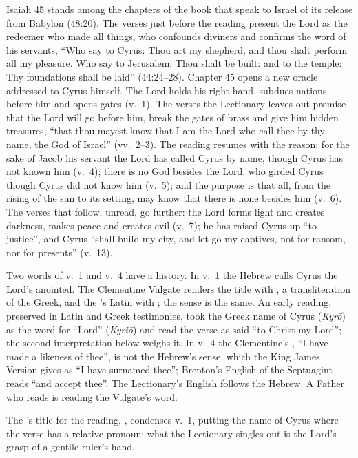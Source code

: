 Isaiah 45 stands among the chapters of the book that speak to Israel of its
release from Babylon (48:20). The verses just before the reading present the Lord as the
redeemer who made all things, who confounds diviners and confirms the word of
his servants, ``Who say to Cyrus: Thou art my shepherd, and thou shalt perform
all my pleasure. Who say to Jerusalem: Thou shalt be built: and to the temple:
Thy foundations shall be laid'' (44:24--28). Chapter 45 opens a new oracle
addressed to Cyrus himself. The Lord holds his right hand, subdues nations
before him and opens gates (v.~1). The verses the Lectionary leaves out promise
that the Lord will go before him, break the gates of brass and give him hidden
treasures, ``that thou mayest know that I am the Lord who call thee by thy
name, the God of Israel'' (vv.~2--3). The reading resumes with the reason: for
the sake of Jacob his servant the Lord has called Cyrus by name, though Cyrus
has not known him (v.~4); there is no God besides the Lord, who girded Cyrus
though Cyrus did not know him (v.~5); and the purpose is that all, from the
rising of the sun to its setting, may know that there is none besides him
(v.~6). The verses that follow, unread, go further: the Lord forms light and
creates darkness, makes peace and creates evil (v.~7); he has raised Cyrus up
``to justice'', and Cyrus ``shall build my city, and let go my captives, not
for ransom, nor for presents'' (v.~13).

Two words of v.~1 and v.~4 have a history. In v.~1 the Hebrew calls Cyrus the
Lord's anointed. The Clementine Vulgate renders the title with
, a transliteration of the Greek, and the 's Latin
with ; the sense is the same. An early reading, preserved in Latin
and Greek testimonies, took the Greek name of Cyrus (\textit{Kyr\=o}) as the
word for ``Lord'' (\textit{Kyri\=o}) and read the verse as said ``to Christ my
Lord''; the second interpretation below weighs it. In v.~4 the Clementine's
, ``I have made a likeness of thee'', is not the
Hebrew's sense, which the King James Version gives as ``I have surnamed thee'';
Brenton's English of the Septuagint reads ``and accept thee''. The
Lectionary's English follows the Hebrew. A Father who reads 
is reading the Vulgate's word.

The 's title for the reading, , condenses v.~1, putting the name of Cyrus
where the verse has a relative pronoun: what the Lectionary singles out is the
Lord's grasp of a gentile ruler's hand.


